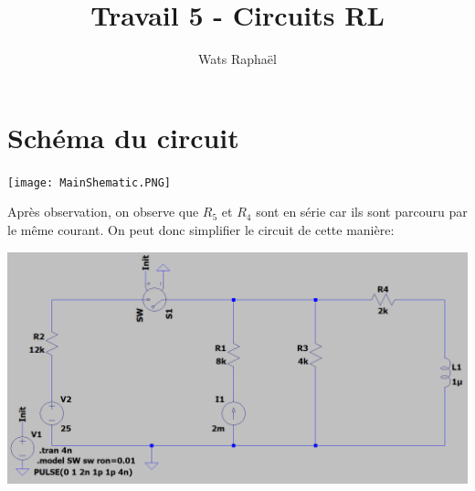\documentclass{homeworg}
\title{Travail 5 - Circuits RL}
\author{Wats Raphaël}
\begin{document}
\maketitle

\section{Schéma du circuit}
    \begin{center}
        \texttt{[image: MainShematic.PNG]}
    \end{center}
    
    Après observation, on observe que $R_5$ et $R_4$ sont en série car ils sont parcouru par le même courant. On peut donc simplifier le circuit de cette manière:
    \begin{center}
        \includegraphics[scale=0.4]{Shematic.PNG}
    \end{center}

\newpage
\end{document}
